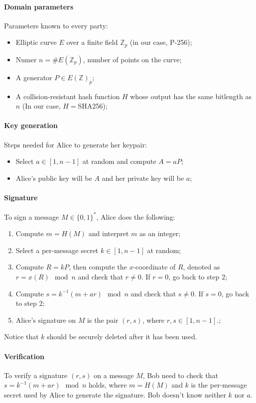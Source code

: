 \documentclass[binding=0.6cm,oneside,noexaminfo]{sapthesis}
\begin{document}
\paragraph{Domain parameters}Parameters known to every party:
\begin{itemize}
  \item Elliptic curve $E$ over a finite field $\mathbb{Z}_p$
  (in our case, P-256);
  \item Numer $n = \#E(\mathbb{Z}_p)$, number of points on the curve;
  \item A generator $P\in E(\mathbb{Z})_p$;
  \item A collision-resistant hash function $H$ whose output has the same
  bitlength as $n$ (In our case, $H = $SHA256);
\end{itemize}

\paragraph{Key generation}Steps needed for Alice to generate her keypair:
\begin{itemize}
  \item Select $a \in [1,n-1]$ at random and compute $A = aP$;
  \item Alice's public key will be $A$ and her private key will be $a$;
\end{itemize}

\paragraph{Signature} To sign a message $M \in \{0,1\}^*$, Alice does the following:
\begin{enumerate}
  \item Compute $m = H(M)$ and interpret $m$ as an integer;
  \item Select a per-message secret $k \in [1,n-1]$ at random;
  \item Compute $R = kP$, then compute the $x$-coordinate of $R$, denoted as 
  $r = x(R) \mod n$ and check that $r \neq 0$. If $r = 0$, go back to step 2;
  \item Compute $s = k^{-1}(m + ar) \mod n$ and check that $s \neq 0$. If $s = 0$, go back to step 2;
  \item Alice's signature on $M$ is the pair $(r,s)$, where $r,s \in [1,n-1]$.;
\end{enumerate}
Notice that $k$ should be securely deleted after it has been used.

\paragraph{Verification} To verify a signature $(r,s)$ on a message $M$, 
Bob need to check that $s = k^{-1}(m + ar) \mod n$ holds, where $m = H(M)$ and $k$ is 
the per-message secret used by Alice to generate the signature. Bob doesn't know neither $k$ nor $a$.
\end{document}
